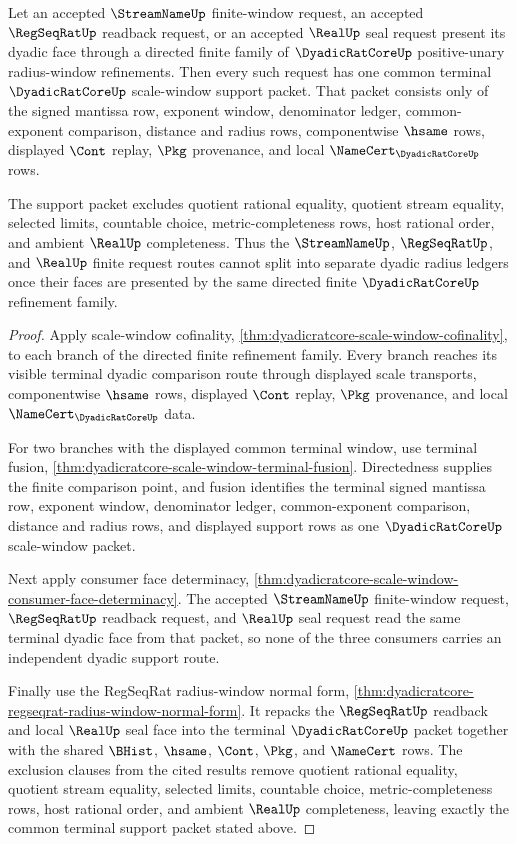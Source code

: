 \begin{theorem}
\label{thm:dyadicratcore-directed-radius-refinement-l10-request-support}
Let an accepted $\StreamNameUp$ finite-window request, an accepted $\RegSeqRatUp$ readback request, or an accepted $\RealUp$ seal request present its dyadic face through a directed finite family of $\DyadicRatCoreUp$ positive-unary radius-window refinements. Then every such request has one common terminal $\DyadicRatCoreUp$ scale-window support packet. That packet consists only of the signed mantissa row, exponent window, denominator ledger, common-exponent comparison, distance and radius rows, componentwise $\hsame$ rows, displayed $\Cont$ replay, $\Pkg$ provenance, and local $\NameCert_{\DyadicRatCoreUp}$ rows.

The support packet excludes quotient rational equality, quotient stream equality, selected limits, countable choice, metric-completeness rows, host rational order, and ambient $\RealUp$ completeness. Thus the $\StreamNameUp$, $\RegSeqRatUp$, and $\RealUp$ finite request routes cannot split into separate dyadic radius ledgers once their faces are presented by the same directed finite $\DyadicRatCoreUp$ refinement family.
\end{theorem}
\begin{proof}
Apply scale-window cofinality, \autoref{thm:dyadicratcore-scale-window-cofinality}, to each branch of the directed finite refinement family. Every branch reaches its visible terminal dyadic comparison route through displayed scale transports, componentwise $\hsame$ rows, displayed $\Cont$ replay, $\Pkg$ provenance, and local $\NameCert_{\DyadicRatCoreUp}$ data.

For two branches with the displayed common terminal window, use terminal fusion, \autoref{thm:dyadicratcore-scale-window-terminal-fusion}. Directedness supplies the finite comparison point, and fusion identifies the terminal signed mantissa row, exponent window, denominator ledger, common-exponent comparison, distance and radius rows, and displayed support rows as one $\DyadicRatCoreUp$ scale-window packet.

Next apply consumer face determinacy, \autoref{thm:dyadicratcore-scale-window-consumer-face-determinacy}. The accepted $\StreamNameUp$ finite-window request, $\RegSeqRatUp$ readback request, and $\RealUp$ seal request read the same terminal dyadic face from that packet, so none of the three consumers carries an independent dyadic support route.

Finally use the RegSeqRat radius-window normal form, \autoref{thm:dyadicratcore-regseqrat-radius-window-normal-form}. It repacks the $\RegSeqRatUp$ readback and local $\RealUp$ seal face into the terminal $\DyadicRatCoreUp$ packet together with the shared $\BHist$, $\hsame$, $\Cont$, $\Pkg$, and $\NameCert$ rows. The exclusion clauses from the cited results remove quotient rational equality, quotient stream equality, selected limits, countable choice, metric-completeness rows, host rational order, and ambient $\RealUp$ completeness, leaving exactly the common terminal support packet stated above.
\end{proof}

